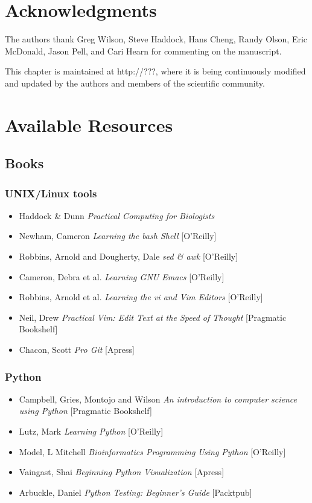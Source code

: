 \documentclass[ChapterTOCs,krantz2]{krantz} %
\begin{document}
\section{Acknowledgments}

The authors thank Greg Wilson, Steve Haddock, Hans Cheng, Randy Olson, 
Eric McDonald, Jason Pell, and Cari Hearn for commenting on the manuscript.


This chapter is maintained at http://???, where it is 
being continuously modified and updated by the authors and members 
of the scientific community.


\section{Available Resources}
\subsection{Books}
\subsubsection{UNIX/Linux tools}
\begin{itemize}
\item Haddock \& Dunn \emph{Practical Computing for Biologists}
\item Newham, Cameron \emph{Learning the bash Shell} [O'Reilly]
\item Robbins, Arnold and Dougherty, Dale \emph{sed \& awk} [O'Reilly]
\item Cameron, Debra et al. \emph{Learning GNU Emacs} [O'Reilly]
\item Robbins, Arnold et al. \emph{Learning the vi and Vim Editors} [O'Reilly]
\item Neil, Drew \emph{Practical Vim: Edit Text at the Speed of Thought} [Pragmatic Bookshelf]
\item Chacon, Scott \emph{Pro Git} [Apress]
\end{itemize}

\subsubsection{Python}
\begin{itemize}
\item Campbell, Gries, Montojo and Wilson \emph{An introduction to computer
science using Python} [Pragmatic Bookshelf]
\item Lutz, Mark \emph{Learning Python} [O'Reilly]
\item Model, L Mitchell \emph{Bioinformatics Programming Using Python} [O'Reilly]
\item Vaingast, Shai \emph{Beginning Python Visualization} [Apress]
\item Arbuckle, Daniel  \emph{Python Testing: Beginner's Guide} [Packtpub]
\end{itemize}
\end{document}

